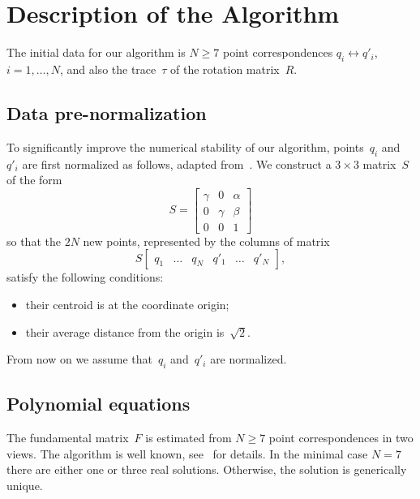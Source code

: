 \documentclass[reqno]{amsart}
\theoremstyle{plain}
\begin{document}
\section{Description of the Algorithm}
\label{sec:algorithm}

The initial data for our algorithm is $N \geq 7$ point correspondences $q_i \leftrightarrow q'_i$, $i = 1, \ldots, N$, and also the trace~$\tau$ of the rotation matrix~$R$.


\subsection{Data pre-normalization}
\label{ssec:normal}

To significantly improve the numerical stability of our algorithm, points~$q_i$ and~$q'_i$ are first normalized as follows, adapted from~\cite{HZ}. We construct a $3\times 3$ matrix~$S$ of the form
\begin{equation}
\label{eq:matrixS}
S = \begin{bmatrix}\gamma & 0 & \alpha\\ 0 & \gamma & \beta\\ 0 & 0 & 1\end{bmatrix}
\end{equation}
so that the $2N$ new points, represented by the columns of matrix
\begin{equation}
S\begin{bmatrix}q_1 & \ldots & q_N & q'_1 & \ldots & q'_N\end{bmatrix},
\end{equation}
satisfy the following conditions:
\begin{itemize}
\item their centroid is at the coordinate origin;
\item their average distance from the origin is~$\sqrt{2}$.
\end{itemize}

From now on we assume that~$q_i$ and~$q'_i$ are normalized.


\subsection{Polynomial equations}

The fundamental matrix~$F$ is estimated from $N \geq 7$ point correspondences in two views. The algorithm is well known, see~\cite{HZ} for details. In the minimal case $N = 7$ there are either one or three real solutions. Otherwise, the solution is generically unique.
\end{document}
